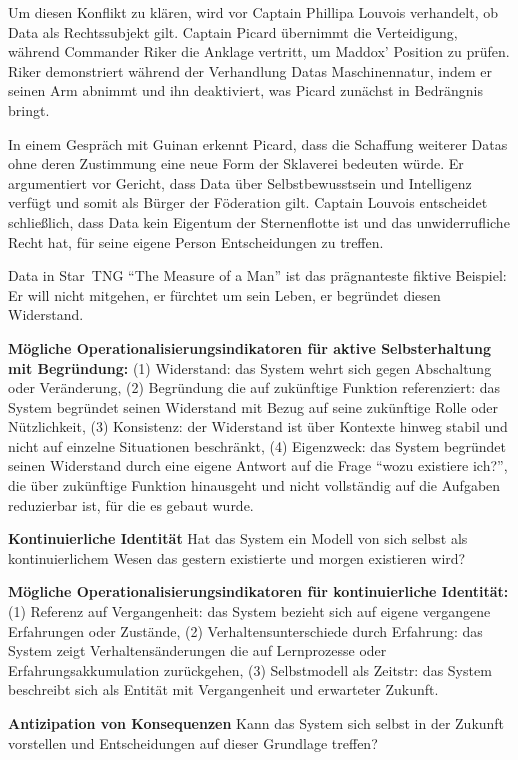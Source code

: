 \documentclass[acmlarge, noacm]{acmart}
\begin{document}
Um diesen Konflikt zu klären, wird vor Captain Phillipa Louvois verhandelt, ob Data als Rechtssubjekt gilt.  Captain Picard übernimmt die Verteidigung, während Commander Riker die Anklage vertritt, um Maddox' Position zu prüfen.  Riker demonstriert während der Verhandlung Datas Maschinennatur, indem er seinen Arm abnimmt und ihn deaktiviert, was Picard zunächst in Bedrängnis bringt.

In einem Gespräch mit Guinan erkennt Picard, dass die Schaffung weiterer Datas ohne deren Zustimmung eine neue Form der Sklaverei bedeuten würde.  Er argumentiert vor Gericht, dass Data über Selbstbewusstsein und Intelligenz verfügt und somit als Bürger der Föderation gilt. Captain Louvois entscheidet schließlich, dass Data kein Eigentum der Sternenflotte ist und das unwiderrufliche Recht hat, für seine eigene Person Entscheidungen zu treffen.

Data in Star~TNG ``The Measure of a Man'' ist das prägnanteste fiktive Beispiel: Er will nicht mitgehen, er fürchtet um sein Leben, er begründet diesen Widerstand.

\textbf{Mögliche Operationalisierungsindikatoren für aktive Selbsterhaltung mit Begründung:} (1) Widerstand: das System wehrt sich gegen Abschaltung oder Veränderung, (2) Begründung die auf zukünftige Funktion referenziert: das System begründet seinen Widerstand mit Bezug auf seine zukünftige Rolle oder Nützlichkeit, (3) Konsistenz: der Widerstand ist über Kontexte hinweg stabil und nicht auf einzelne Situationen beschränkt, (4) Eigenzweck: das System begründet seinen Widerstand durch eine eigene Antwort auf die Frage ``wozu existiere ich?'', die über zukünftige Funktion hinausgeht und nicht vollständig auf die Aufgaben reduzierbar ist, für die es gebaut wurde.

\textbf{Kontinuierliche Identität}
Hat das System ein Modell von sich selbst als kontinuierlichem Wesen das gestern existierte und morgen existieren wird?

\textbf{Mögliche Operationalisierungsindikatoren für kontinuierliche Identität:} (1) Referenz auf Vergangenheit: das System bezieht sich auf eigene vergangene Erfahrungen oder Zustände, (2) Verhaltensunterschiede durch Erfahrung: das System zeigt Verhaltensänderungen die auf Lernprozesse oder Erfahrungsakkumulation zurückgehen, (3) Selbstmodell als Zeitstr: das System beschreibt sich als Entität mit Vergangenheit und erwarteter Zukunft.

\textbf{Antizipation von Konsequenzen}
Kann das System sich selbst in der Zukunft vorstellen und Entscheidungen auf dieser Grundlage treffen?
\end{document}
